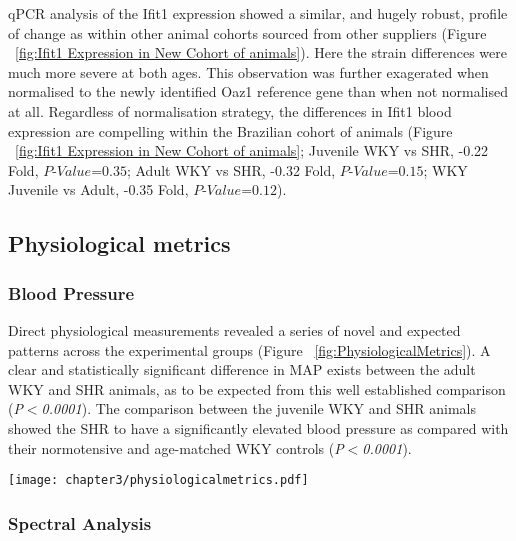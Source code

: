 qPCR analysis of the Ifit1 expression showed a similar, and hugely robust, profile of change as within other animal cohorts sourced from other suppliers (Figure ~\ref{fig:Ifit1 Expression in New Cohort of animals}). Here the strain differences were much more severe at both ages. This observation was further exagerated when normalised to the newly identified Oaz1 reference gene than when not normalised at all. Regardless of normalisation strategy, the differences in Ifit1 blood expression are compelling within the Brazilian cohort of animals (Figure ~\ref{fig:Ifit1 Expression in New Cohort of animals}; Juvenile WKY vs SHR, -0.22 Fold, $\textit{P-Value=0.35}$; Adult WKY vs SHR, -0.32 Fold, $\textit{P-Value=0.15}$; WKY Juvenile vs Adult, -0.35 Fold, $\textit{P-Value=0.12}$). 


\subsection{Physiological metrics}

\subsubsection{Blood Pressure}

Direct physiological measurements revealed a series of novel and expected patterns across the experimental groups (Figure ~\ref{fig:PhysiologicalMetrics}). A clear and statistically significant difference in MAP exists between the adult WKY and SHR animals, as to be expected from this well established comparison (\textit{P$<$0.0001}). The comparison between the juvenile WKY and SHR animals showed the SHR to have a significantly elevated blood pressure as compared with their normotensive and age-matched WKY controls (\textit{P$<$0.0001}). 

\begin{figure*}[!htbp]
\centering
  \texttt{[image: chapter3/physiologicalmetrics.pdf]} \\
\caption{Physiological data in SHR and WKY strains at both juvenile and adult ages. Statistics are presented as unpaired Student's T-Test P-values, between strains at any given age (P-value$<$0.05, *; P-value$<$0.01, **; P-value$<$0.001, ***).}
\label{fig:PhysiologicalMetrics}
\end{figure*}

\subsubsection{Spectral Analysis}


